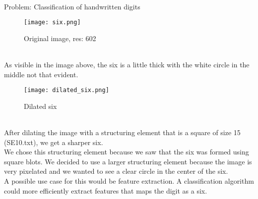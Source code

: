 \documentclass[a4paper]{article}
\begin{document}
\newpage
\large{} \\ 

Problem: Classification of handwritten digits \\
\begin{figure}[htp]
    \centering
    \texttt{[image: six.png]}
    \caption{Original image, res: 602}
    \label{fig:erosionSym}
\end{figure}\\
As visible in the image above, the six is a little thick with the white circle in the middle not that evident.
\begin{figure}[htp]
    \centering
    \texttt{[image: dilated\_six.png]}
    \caption{Dilated six}
    \label{fig:erosionAsym}
\end{figure}\\
After dilating the image with a structuring element that is a square of size 15 (SE10.txt), we get a sharper six.\\

We chose this structuring element because we saw that the six was formed using square blots. We decided to use a larger structuring element because the image is very pixelated and we wanted to see a clear circle in the center of the six.\\

A possible use case for this would be feature extraction. A classification algorithm could more efficiently extract features that maps the digit as a six.

\newpage
\large{} \\
\end{document}
